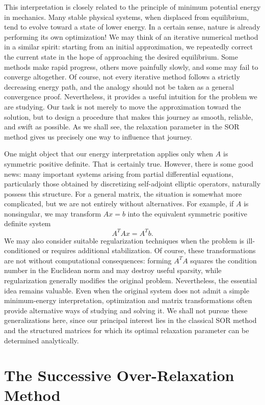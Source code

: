 \documentclass[11pt,a4paper]{article}
\theoremstyle{definition}
\theoremstyle{remark}
\begin{document}
This interpretation is closely related to the
principle of minimum potential energy in mechanics.
Many stable physical systems, when displaced from
equilibrium, tend to evolve toward a state of lower
energy. In a certain sense, nature is already
performing its own optimization! We may think of
an iterative numerical method in a similar spirit:
starting from an initial approximation, we repeatedly
correct the current state in the hope of approaching
the desired equilibrium. Some methods make rapid
progress, others move painfully slowly, and some
may fail to converge altogether. Of course, not
every iterative method follows a strictly decreasing
energy path, and the analogy should not be taken
as a general convergence proof. Nevertheless, it
provides a useful intuition for the problem we
are studying. Our task is not merely to move the
approximation toward the solution, but to design
a procedure that makes this journey as smooth,
reliable, and swift as possible. As we shall see,
the relaxation parameter in the SOR method gives
us precisely one way to influence that journey.


One might object that our energy
interpretation applies only when $A$ is symmetric
positive definite. That is certainly true. However,
there is some good news: many important systems
arising from partial differential equations,
particularly those obtained by discretizing
self-adjoint elliptic operators, naturally possess
this structure. For a general matrix, the situation
is somewhat more complicated, but we are not
entirely without alternatives. For example, if
$A$ is nonsingular, we may transform $Ax=b$ into
the equivalent symmetric positive definite system
\[
    A^T A x=A^T b.
\]
We may also consider suitable regularization
techniques when the problem is ill-conditioned
or requires additional stabilization. Of course,
these transformations are not without computational
consequences: forming $A^T A$ squares the
condition number in the Euclidean norm and may
destroy useful sparsity, while regularization
generally modifies the original problem.
Nevertheless, the essential idea remains
valuable. Even when the original system does
not admit a simple minimum-energy interpretation,
optimization and matrix transformations often
provide alternative ways of studying and solving
it. We shall not pursue these generalizations
here, since our principal interest lies in the
classical SOR method and the structured matrices
for which its optimal relaxation parameter can
be determined analytically.


\section{The Successive Over-Relaxation Method}
\end{document}
